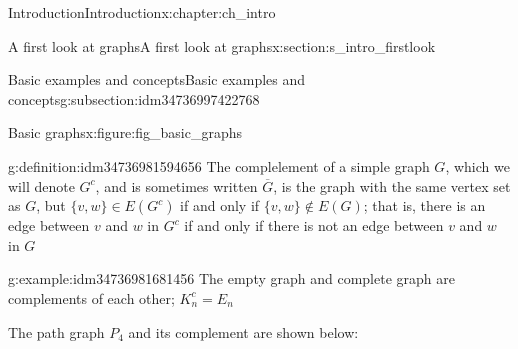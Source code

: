 \documentclass[oneside,10pt,]{book}
\numberwithin{equation}{section}
\begin{document}
\begin{chapterptx}{Introduction}{}{Introduction}{}{}{x:chapter:ch_intro}
\begin{sectionptx}{A first look at graphs}{}{A first look at graphs}{}{}{x:section:s_intro_firstlook}
\begin{subsectionptx}{Basic examples and concepts}{}{Basic examples and concepts}{}{}{g:subsection:idm34736997422768}
\begin{figureptx}{Basic graphs}{x:figure:fig_basic_graphs}{}
\begin{image}{0.05}{0.9}{0.05}
{
}%
\end{image}%
\tcblower
\end{figureptx}%
\begin{definition}{}{g:definition:idm34736981594656}%
The complelement of a simple graph \(G\), which we will denote \(G^c\), and is sometimes written \(\overline{G}\), is the graph with the same vertex set as \(G\), but \(\{v,w\}\in E(G^c)\) if and only if \(\{v,w\}\notin E(G)\); that is, there is an edge between \(v\) and \(w\) in \(G^c\) if and only if there is not an edge between \(v\) and \(w\) in \(G\)%
\end{definition}
\begin{example}{}{g:example:idm34736981681456}%
The empty graph and complete graph are complements of each other; \(K_n^c=E_n\)%
\par
The path graph \(P_4\) and its complement are shown below:%
\begin{image}{0.05}{0.9}{0.05}%
\end{image}
\end{example}
\end{subsectionptx}
\end{sectionptx}
\end{chapterptx}
\end{document}
